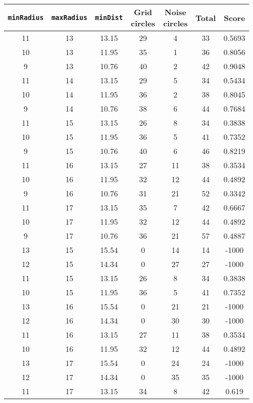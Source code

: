 \documentclass[letterpaper, 12pt]{article}
\begin{document}
\begin{longtable}{|c|c|c|c|c|c|c|}
\hline
\textbf{\texttt{minRadius}} & \textbf{\texttt{maxRadius}} & \textbf{\texttt{minDist}} & \textbf{Grid circles} & \textbf{Noise circles} & \textbf{Total} & \textbf{Score} \\
\hline
11 & 13 & 13.15 & 29 & 4 & 33 & 0.5693 \\
\hline
10 & 13 & 11.95 & 35 & 1 & 36 & 0.8056 \\
\hline
9 & 13 & 10.76 & 40 & 2 & 42 & 0.9048 \\
\hline
11 & 14 & 13.15 & 29 & 5 & 34 & 0.5434 \\
\hline
10 & 14 & 11.95 & 36 & 2 & 38 & 0.8045 \\
\hline
9 & 14 & 10.76 & 38 & 6 & 44 & 0.7684 \\
\hline
11 & 15 & 13.15 & 26 & 8 & 34 & 0.3838 \\
\hline
10 & 15 & 11.95 & 36 & 5 & 41 & 0.7352 \\
\hline
9 & 15 & 10.76 & 40 & 6 & 46 & 0.8219 \\
\hline
11 & 16 & 13.15 & 27 & 11 & 38 & 0.3534 \\
\hline
10 & 16 & 11.95 & 32 & 12 & 44 & 0.4892 \\
\hline
9 & 16 & 10.76 & 31 & 21 & 52 & 0.3342 \\
\hline
11 & 17 & 13.15 & 35 & 7 & 42 & 0.6667 \\
\hline
10 & 17 & 11.95 & 32 & 12 & 44 & 0.4892 \\
\hline
9 & 17 & 10.76 & 36 & 21 & 57 & 0.4887 \\
\hline
13 & 15 & 15.54 & 0 & 14 & 14 & -1000 \\
\hline
12 & 15 & 14.34 & 0 & 27 & 27 & -1000 \\
\hline
11 & 15 & 13.15 & 26 & 8 & 34 & 0.3838 \\
\hline
10 & 15 & 11.95 & 36 & 5 & 41 & 0.7352 \\
\hline
13 & 16 & 15.54 & 0 & 21 & 21 & -1000 \\
\hline
12 & 16 & 14.34 & 0 & 30 & 30 & -1000 \\
\hline
11 & 16 & 13.15 & 27 & 11 & 38 & 0.3534 \\
\hline
10 & 16 & 11.95 & 32 & 12 & 44 & 0.4892 \\
\hline
13 & 17 & 15.54 & 0 & 24 & 24 & -1000 \\
\hline
12 & 17 & 14.34 & 0 & 35 & 35 & -1000 \\
\hline
11 & 17 & 13.15 & 34 & 8 & 42 & 0.619 \\

\end{longtable}
\end{document}
